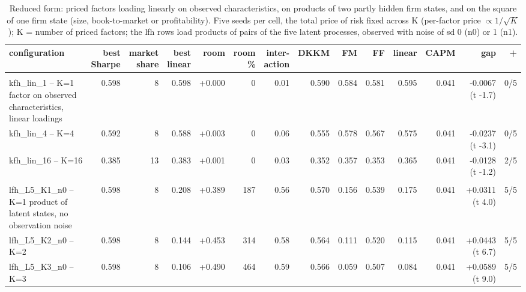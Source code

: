 \begin{table}[htbp]\centering\footnotesize\setlength{\tabcolsep}{2pt}
\caption{Reduced form: priced factors loading linearly on observed characteristics, on products of two partly hidden firm states, and on the square of one firm state (size, book-to-market or profitability). Five seeds per cell, the total price of risk fixed across K (per-factor price $\propto 1/\sqrt{K}$); K = number of priced factors; the lfh rows load products of pairs of the five latent processes, observed with noise of sd 0 (n0) or 1 (n1).}\label{tab:rf}
\begin{adjustbox}{max width=\textwidth}\begin{tabular}{>{\raggedright\arraybackslash}p{4.6cm}rrrrrrrrrrrrr}\hline
configuration & \shortstack[r]{best\\Sharpe} & \shortstack[r]{market\\share} & \shortstack[r]{best\\linear} & room & \shortstack[r]{room\\\%} & \shortstack[r]{inter-\\action} & DKKM & FM & FF & linear & CAPM & gap & + \\\hline
\multicolumn{14}{l}{\textit{Linear loadings on observed characteristics}} \\
kfh\_lin\_1 -- K=1 factor on observed characteristics, linear loadings & 0.598 & 8 & 0.598 & +0.000 & 0 & 0.01 & 0.590 & 0.584 & 0.581 & 0.595 & 0.041 & -0.0067 (t -1.7) & 0/5 \\
kfh\_lin\_4 -- K=4 & 0.592 & 8 & 0.588 & +0.003 & 0 & 0.06 & 0.555 & 0.578 & 0.567 & 0.575 & 0.041 & -0.0237 (t -3.1) & 0/5 \\
kfh\_lin\_16 -- K=16 & 0.385 & 13 & 0.383 & +0.001 & 0 & 0.03 & 0.352 & 0.357 & 0.353 & 0.365 & 0.041 & -0.0128 (t -1.2) & 2/5 \\
\hline
\multicolumn{14}{l}{\textit{Interactions: products of two partly hidden firm states}} \\
lfh\_L5\_K1\_n0 -- K=1 product of latent states, no observation noise & 0.598 & 8 & 0.208 & +0.389 & 187 & 0.56 & 0.570 & 0.156 & 0.539 & 0.175 & 0.041 & +0.0311 (t 4.0) & 5/5 \\
lfh\_L5\_K2\_n0 -- K=2 & 0.598 & 8 & 0.144 & +0.453 & 314 & 0.58 & 0.564 & 0.111 & 0.520 & 0.115 & 0.041 & +0.0443 (t 6.7) & 5/5 \\
lfh\_L5\_K3\_n0 -- K=3 & 0.598 & 8 & 0.106 & +0.490 & 464 & 0.59 & 0.566 & 0.059 & 0.507 & 0.084 & 0.041 & +0.0589 (t 9.0) & 5/5 \\

\end{tabular}
\end{adjustbox}
\end{table}
